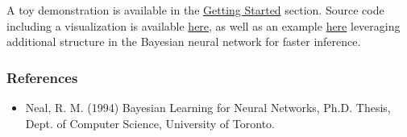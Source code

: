 A toy demonstration is available in the \href{getting-started}{Getting Started} section.
Source code including a visualization is available
\href{https://github.com/blei-lab/edward/blob/master/examples/bayesian_nn.py}
{here}, as well as an example
\href{https://github.com/blei-lab/edward/blob/master/examples/bayesian_nn_analytic_kl.py}
{here}
leveraging additional structure in the
Bayesian neural network for faster inference.

\subsubsection{References}\label{references}

\begin{itemize}
\item
  Neal, R. M. (1994) Bayesian Learning for Neural Networks, Ph.D.
  Thesis, Dept. of Computer Science, University of Toronto.
\end{itemize}
